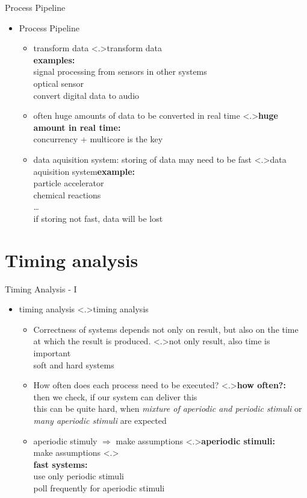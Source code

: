 \documentclass[ngerman={babel}, utf8, bigger, t, xcolor={table,dvipsnames}, ompress, hyperref={bookmarks,colorlinks},red]{beamer}
\begin{document}
\begin{frame}{Process Pipeline}
	\begin{itemize}
		\item Process Pipeline
		\begin{itemize}
			\item transform data
			\note<.>{transform data \\ \textbf{examples:}\\ signal processing from sensors in other systems \\ optical sensor \\ convert digital data to audio}
			\item often huge amounts of data to be converted in real time
			\note<.>{\textbf{huge amount in real time:}\\ concurrency + multicore is the key}
			\item data aquisition system: storing of data may need to be fast
			\note<.>{data aquisition system\textbf{example:}\\ particle accelerator \\ chemical reactions \\ \dots \\ if storing not fast, data will be lost}
		\end{itemize}
	\end{itemize}
\end{frame}

\section{Timing analysis}
\begin{frame}{Timing Analysis - I}
	\begin{itemize}
		\item timing analysis
		\note<.>{timing analysis}
		\begin{itemize}
			\item Correctness of systems depends not only on result, but also on the time at which the result is produced.
			\note<.>{not only result, also time is important \\ soft and hard systems}
			\item How often does each process need to be executed?
			\note<.>{\textbf{how often?:}\\ then we check, if our system can deliver this \\ this can be quite hard, when \emph{mixture of aperiodic and periodic stimuli} or \emph{many aperiodic stimuli} are expected}
			\item aperiodic stimuly $\Rightarrow$ make assumptions
			\note<.>{\textbf{aperiodic stimuli:} \\ make assumptions}
			\note<.>{\\ \vspace*{1em} \textbf{fast systems:}\\ use only periodic stimuli \\ poll frequently for aperiodic stimuli}
		\end{itemize}
	\end{itemize}
\end{frame}
\end{document}
